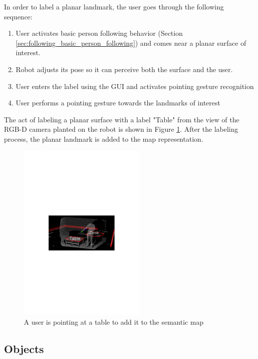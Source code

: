 In order to label a planar landmark, the user goes through the following sequence:

\begin{enumerate}
\item User activates basic person following behavior (Section \ref{sec:following_basic_person_following}) and comes near a planar surface of interest.
\item Robot adjusts its pose so it can perceive both the surface and the user.
\item User enters the label using the GUI and activates pointing gesture recognition
\item User performs a pointing gesture towards the landmarks of interest
\end{enumerate}

The act of labeling a planar surface with a label "Table" from the view of the RGB-D camera planted on the robot is shown in Figure \ref{fig:pointing_table_desk}. After the labeling process, the planar landmark is added to the map representation.

\begin{figure}[ht!]
\centering
\includegraphics[width=0.55\textwidth]{pics/pointing_table_desk}
\caption{A user is pointing at a table to add it to the semantic map}
\label{fig:pointing_table_desk}
\end{figure}

\subsection{Objects}
\label{sec:map_objects}

